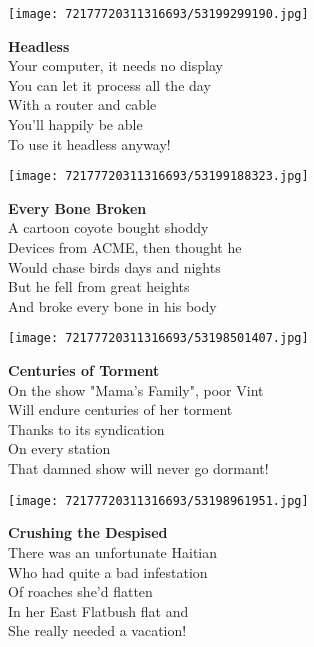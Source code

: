 \documentclass[10pt,letterpaper]{article}
\begin{document}
\begin{center}\texttt{[image: 72177720311316693/53199299190.jpg]}
\end{center}
\begin{center}
\textbf{Headless}\\
\vskip 0.2in
Your computer, it needs no display\\
You can let it process all the day\\
With a router and cable\\
You'll happily be able\\
To use it headless anyway!\\
\end{center}
\pagebreak

\begin{center}
\texttt{[image: 72177720311316693/53199188323.jpg]}
\end{center}

\begin{center}
\textbf{Every Bone Broken}\\
\vskip 0.2in
A cartoon coyote bought shoddy\\
Devices from ACME, then thought he\\
Would chase birds days and nights\\
But he fell from great heights\\
And broke every bone in his body\\
\end{center}
\pagebreak

\begin{center}\texttt{[image: 72177720311316693/53198501407.jpg]}
\end{center}
\begin{center}
\textbf{Centuries of Torment}\\
\vskip 0.2in
On the show "Mama's Family", poor Vint\\
Will endure centuries of her torment\\
Thanks to its syndication\\
On every station\\
That damned show will never go dormant!\\
\end{center}
\pagebreak

\begin{center}\texttt{[image: 72177720311316693/53198961951.jpg]}
\end{center}
\begin{center}
\textbf{Crushing the Despised}\\
\vskip 0.2in
There was an unfortunate Haitian\\
Who had quite a bad infestation\\
Of roaches she'd flatten\\
In her East Flatbush flat and\\
She really needed a vacation!\\
\end{center}
\pagebreak
\end{document}
